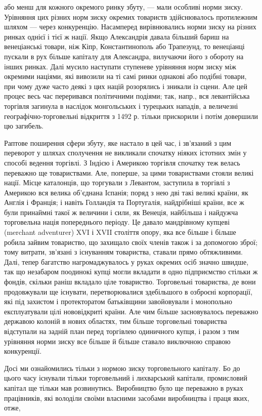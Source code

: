 \parcont{}  %
або менш для кожного окремого ринку збуту, — мали особливі норми зиску. Урівняння цих різних норм зиску окремих товариств здійснювалось протилежним шляхом — через конкуренцію. Насамперед вирівнювались норми зиску на різних ринках однієї і тієї ж
нації. Якщо Александрія давала більший бариш на венеціанські товари, ніж Кіпр, Константинополь або Трапезунд, то венеціанці
пускали в рух більше капіталу для Александра, вилучаючи його з обороту на інших ринках. Далі мусило наступати ступеневе
урівняння норм зиску між окремими націями, які вивозили на ті самі ринки однакові або подібні товари, при чому дуже часто
деякі з цих націй розорялись і зникали із сцени. Але цей процес весь час переривався політичними подіями; так, напр., вся
левантійська торгівля загинула в наслідок монгольських і турецьких нападів, а величезні географічно-торговельні відкриття з
1492 р. тільки прискорили і потім довершили цю загибель.

Раптове поширення сфери збуту, яке настало в цей час, і зв’язаний з
цим переворот у шляхах сполучення не викликали спочатку ніяких істотних змін у способі ведення торгівлі. З Індією і Америкою
торгівля спочатку теж велась переважно ще товариствами. Але, поперше, за цими товариствами стояли великі нації. Місце
каталонців, що торгували з Левантом, заступила в торгівлі з Америкою вся велика об’єднана Іспанія; поряд з нею дві такі
великі країни, як Англія і Франція; і навіть Голландія та Португалія, найдрібніші країни, все ж були принаймні такої ж
величини і сили, як Венеція, найбільша і найдужча торговельна нація попереднього періоду. Це давало мандрівному купцеві (merchant adventurer) XVI і XVII століття опору, яка все більше і більше робила зайвим товариство, що захищало своїх членів
також і за допомогою зброї; тому витрати, зв’язані з існуванням товариства, ставали прямо обтяжливими. Далі, тепер багатство
нагромаджувалось у руках окремих осіб значно швидше, так що незабаром поодинокі купці могли вкладати в одно підприємство
стільки ж фондів, скільки раніш вкладало ціле товариство. Торговельні товариства, де вони продовжували ще існувати,
перетворювалися здебільшого в озброєні корпорації, які під захистом і протекторатом батьківщини завойовували і монопольно
експлуатували цілі нововідкриті країни. Але чим більше засновувалось переважно державою колоній в нових областях, тим більше
торговельні товариства відступали на задній план перед торгівлею одиничного купця, і разом з тим урівняння норми зиску все
більше й більше ставало виключною справою конкуренції.

Досі ми ознайомились тільки з нормою зиску торговельного капіталу. Бо
до цього часу існували тільки торговельний і лихварський капітали, промисловий капітал ще тільки мав розвинутись.
Виробництво було ще переважно в руках працівників, які володіли своїми власними засобами виробництва і праця яких, отже,
\parbreak{}  %
